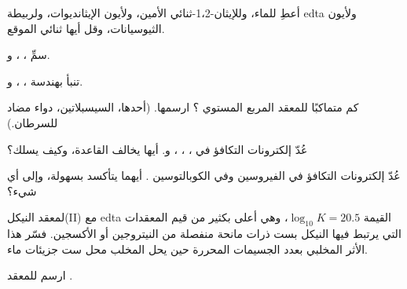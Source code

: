 \begin{exercise}[$\star$]\label{exo:b2:coordination-complexes:2}
أعطِ  للماء، وللإيثان-1،2-ثنائي الأمين، ولأيون الإيثانديوات، ولربيطة edta 
ولأيون الثيوسيانات، وقل أيها ثنائي الموقع.
\end{exercise}

\begin{exercise}[$\star$]\label{exo:b2:coordination-complexes:3}
سمِّ ، ،  
و\ce{[Ni(CO)4]}.
\end{exercise}

\begin{exercise}[$\star$]\label{exo:b2:coordination-complexes:4}
تنبأ بهندسة \ce{[Ag(NH3)2]+}، ،  
و.
\end{exercise}

\begin{exercise}[$\star\star$]\label{exo:b2:coordination-complexes:5}
كم متماكبًا للمعقد المربع المستوي \ce{[PtCl2(NH3)2]}؟ ارسمها. (أحدها،
السيسبلاتين، دواء مضاد للسرطان.)
\end{exercise}

\begin{exercise}[$\star\star$]\label{exo:b2:coordination-complexes:6}
عُدّ إلكترونات التكافؤ في ، ، ،
 و. أيها يخالف القاعدة، وكيف يسلك؟
\end{exercise}

\begin{exercise}[$\star\star$]\label{exo:b2:coordination-complexes:7}
عُدّ إلكترونات التكافؤ في الفيروسين وفي الكوبالتوسين . أيهما
يتأكسد بسهولة، وإلى أي شيء؟
\end{exercise}

\begin{exercise}[$\star\star$]\label{exo:b2:coordination-complexes:8}
لمعقد النيكل(II) مع edta القيمة $\log_{10}K = 20.5$، وهي أعلى بكثير من قيم المعقدات التي
يرتبط فيها النيكل بست ذرات مانحة منفصلة من النيتروجين أو الأكسجين. فسّر هذا الأثر المخلبي
بعدد الجسيمات المحررة حين يحل المخلب محل ست جزيئات
ماء.
\end{exercise}

\begin{exercise}[$\star\star$]\label{exo:b2:coordination-complexes:9}
ارسم  للمعقد .
\end{exercise}

